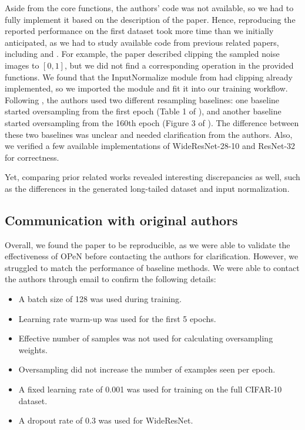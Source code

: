 Aside from the core functions, the authors' code was not available, so we had to fully implement it based on the description of the paper. Hence, reproducing the reported performance on the first dataset took more time than we initially anticipated, as we had to study available code from previous related papers, including \citet{M2m} and \citet{LDAM-DRW}. For example, the paper described clipping the sampled noise images to $[0, 1]$, but we did not find a corresponding operation in the provided functions. We found that the InputNormalize module from \citet{M2m} had clipping already implemented, so we imported the module and fit it into our training workflow. Following \citet{LDAM-DRW}, the authors used two different resampling baselines: one baseline started oversampling from the first epoch (Table 1 of \citep{PureNoise}), and another baseline started oversampling from the 160th epoch (Figure 3 of \citep{PureNoise}). The difference between these two baselines was unclear and needed clarification from the authors. Also, we verified a few available implementations of WideResNet-28-10 \citep{WideResNet} and ResNet-32 \citep{ResNet} for correctness. 

Yet, comparing prior related works revealed interesting discrepancies as well, such as the differences in the generated long-tailed dataset and input normalization.

\subsection{Communication with original authors}
\label{sec:communication}

Overall, we found the paper to be reproducible, as we were able to validate the effectiveness of OPeN before contacting the authors for clarification. However, we struggled to match the performance of baseline methods. We were able to contact the authors through email to confirm the following details:

\begin{itemize}[noitemsep]
    \item A batch size of 128 was used during training.
    \item Learning rate warm-up \citep{ImageNet1h} was used for the first 5 epochs.
    \item Effective number of samples \citep{ClassBalancedLoss} was not used for calculating oversampling weights.
    \item Oversampling did not increase the number of examples seen per epoch.
    \item A fixed learning rate of 0.001 was used for training on the full CIFAR-10 dataset.
    \item A dropout rate of 0.3 was used for WideResNet.
\end{itemize}
